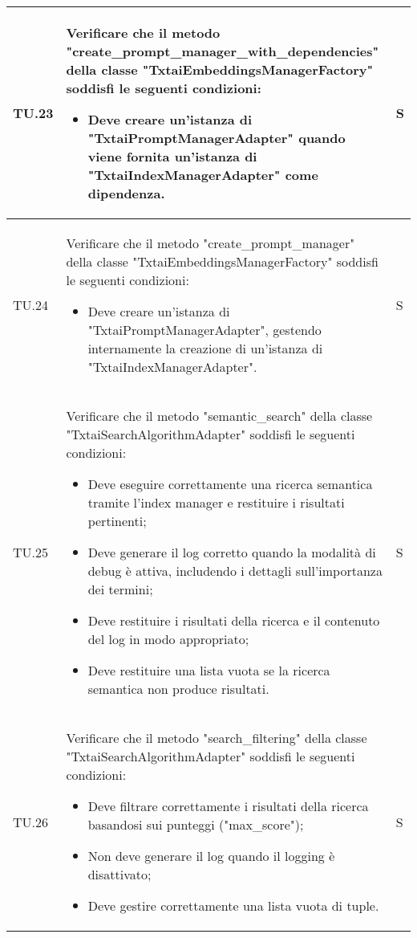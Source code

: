 \begin{adjustwidth}{-0.5cm}{-0.5cm}
\begin{longtable}{|P{1.5cm}|>{\raggedright}P{9.5cm}|>{\arraybackslash}P{1.5cm}|}
		\hline TU.23 & Verificare che il metodo "create\_prompt\_manager\_with\_dependencies" della classe "TxtaiEmbeddingsManagerFactory" soddisfi le seguenti condizioni:
		\begin{itemize}
			\item Deve creare un'istanza di "TxtaiPromptManagerAdapter" quando viene fornita un'istanza di "TxtaiIndexManagerAdapter" come dipendenza.
		\end{itemize} & S \\

		\hline TU.24 & Verificare che il metodo "create\_prompt\_manager" della classe "TxtaiEmbeddingsManagerFactory" soddisfi le seguenti condizioni:
		\begin{itemize}
			\item Deve creare un'istanza di "TxtaiPromptManagerAdapter", gestendo internamente la creazione di un'istanza di "TxtaiIndexManagerAdapter".
		\end{itemize} & S \\

		\hline TU.25 & Verificare che il metodo "semantic\_search" della classe "TxtaiSearchAlgorithmAdapter" soddisfi le seguenti condizioni:
		\begin{itemize}
			\item Deve eseguire correttamente una ricerca semantica tramite l'index manager e restituire i risultati pertinenti;
			\item Deve generare il log corretto quando la modalità di debug è attiva, includendo i dettagli sull'importanza dei termini;
			\item Deve restituire i risultati della ricerca e il contenuto del log in modo appropriato;
   			\item Deve restituire una lista vuota se la ricerca semantica non produce risultati.
		\end{itemize} & S \\

		\hline TU.26 & Verificare che il metodo "search\_filtering" della classe "TxtaiSearchAlgorithmAdapter" soddisfi le seguenti condizioni:
		\begin{itemize}
			\item Deve filtrare correttamente i risultati della ricerca basandosi sui punteggi ("max\_score");
			\item Non deve generare il log quando il logging è disattivato;
   			\item Deve gestire correttamente una lista vuota di tuple.
		\end{itemize} & S \\


\end{longtable}
\end{adjustwidth}
